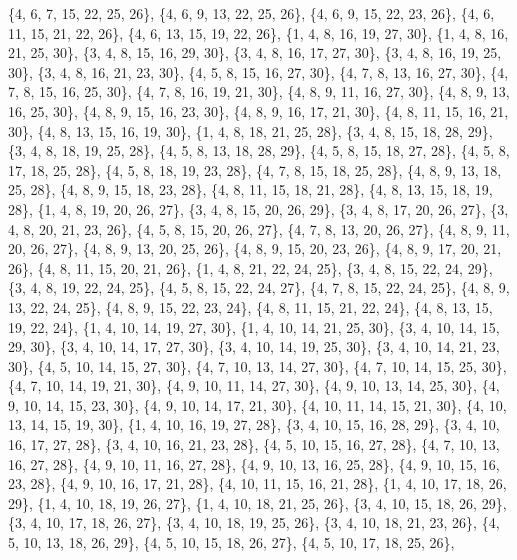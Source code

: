 \documentclass[11pt,a4paper]{article}
\begin{document}
{\{4, 6, 7, 15, 22, 25, 26\}, \{4, 6, 9, 13, 22, 25, 26\}, \{4, 6, 9, 15, 22, 23, 26\}, \{4, 6, 11, 15, 21, 22, 26\}, \{4, 6, 13, 15, 19, 22, 26\},
\{1, 4, 8, 16, 19, 27, 30\}, \{1, 4, 8, 16, 21, 25, 30\}, \{3, 4, 8, 15, 16, 29, 30\}, \{3, 4, 8, 16, 17, 27, 30\}, \{3, 4, 8, 16, 19, 25, 30\},
\{3, 4, 8, 16, 21, 23, 30\}, \{4, 5, 8, 15, 16, 27, 30\}, \{4, 7, 8, 13, 16, 27, 30\}, \{4, 7, 8, 15, 16, 25, 30\}, \{4, 7, 8, 16, 19, 21, 30\},
\{4, 8, 9, 11, 16, 27, 30\}, \{4, 8, 9, 13, 16, 25, 30\}, \{4, 8, 9, 15, 16, 23, 30\}, \{4, 8, 9, 16, 17, 21, 30\}, \{4, 8, 11, 15, 16, 21, 30\},
\{4, 8, 13, 15, 16, 19, 30\}, \{1, 4, 8, 18, 21, 25, 28\}, \{3, 4, 8, 15, 18, 28, 29\}, \{3, 4, 8, 18, 19, 25, 28\}, \{4, 5, 8, 13, 18, 28, 29\},
\{4, 5, 8, 15, 18, 27, 28\}, \{4, 5, 8, 17, 18, 25, 28\}, \{4, 5, 8, 18, 19, 23, 28\}, \{4, 7, 8, 15, 18, 25, 28\}, \{4, 8, 9, 13, 18, 25, 28\},
\{4, 8, 9, 15, 18, 23, 28\}, \{4, 8, 11, 15, 18, 21, 28\}, \{4, 8, 13, 15, 18, 19, 28\}, \{1, 4, 8, 19, 20, 26, 27\}, \{3, 4, 8, 15, 20, 26, 29\},
\{3, 4, 8, 17, 20, 26, 27\}, \{3, 4, 8, 20, 21, 23, 26\}, \{4, 5, 8, 15, 20, 26, 27\}, \{4, 7, 8, 13, 20, 26, 27\}, \{4, 8, 9, 11, 20, 26, 27\},
\{4, 8, 9, 13, 20, 25, 26\}, \{4, 8, 9, 15, 20, 23, 26\}, \{4, 8, 9, 17, 20, 21, 26\}, \{4, 8, 11, 15, 20, 21, 26\}, \{1, 4, 8, 21, 22, 24, 25\},
\{3, 4, 8, 15, 22, 24, 29\}, \{3, 4, 8, 19, 22, 24, 25\}, \{4, 5, 8, 15, 22, 24, 27\}, \{4, 7, 8, 15, 22, 24, 25\}, \{4, 8, 9, 13, 22, 24, 25\},
\{4, 8, 9, 15, 22, 23, 24\}, \{4, 8, 11, 15, 21, 22, 24\}, \{4, 8, 13, 15, 19, 22, 24\}, \{1, 4, 10, 14, 19, 27, 30\}, \{1, 4, 10, 14, 21, 25, 30\},
\{3, 4, 10, 14, 15, 29, 30\}, \{3, 4, 10, 14, 17, 27, 30\}, \{3, 4, 10, 14, 19, 25, 30\}, \{3, 4, 10, 14, 21, 23, 30\}, \{4, 5, 10, 14, 15, 27, 30\},
\{4, 7, 10, 13, 14, 27, 30\}, \{4, 7, 10, 14, 15, 25, 30\}, \{4, 7, 10, 14, 19, 21, 30\}, \{4, 9, 10, 11, 14, 27, 30\}, \{4, 9, 10, 13, 14, 25, 30\},
\{4, 9, 10, 14, 15, 23, 30\}, \{4, 9, 10, 14, 17, 21, 30\}, \{4, 10, 11, 14, 15, 21, 30\}, \{4, 10, 13, 14, 15, 19, 30\}, \{1, 4, 10, 16, 19, 27, 28\},
\{3, 4, 10, 15, 16, 28, 29\}, \{3, 4, 10, 16, 17, 27, 28\}, \{3, 4, 10, 16, 21, 23, 28\}, \{4, 5, 10, 15, 16, 27, 28\}, \{4, 7, 10, 13, 16, 27, 28\},
\{4, 9, 10, 11, 16, 27, 28\}, \{4, 9, 10, 13, 16, 25, 28\}, \{4, 9, 10, 15, 16, 23, 28\}, \{4, 9, 10, 16, 17, 21, 28\}, \{4, 10, 11, 15, 16, 21, 28\},
\{1, 4, 10, 17, 18, 26, 29\}, \{1, 4, 10, 18, 19, 26, 27\}, \{1, 4, 10, 18, 21, 25, 26\}, \{3, 4, 10, 15, 18, 26, 29\}, \{3, 4, 10, 17, 18, 26, 27\},
\{3, 4, 10, 18, 19, 25, 26\}, \{3, 4, 10, 18, 21, 23, 26\}, \{4, 5, 10, 13, 18, 26, 29\}, \{4, 5, 10, 15, 18, 26, 27\}, \{4, 5, 10, 17, 18, 25, 26\},
}
\end{document}
